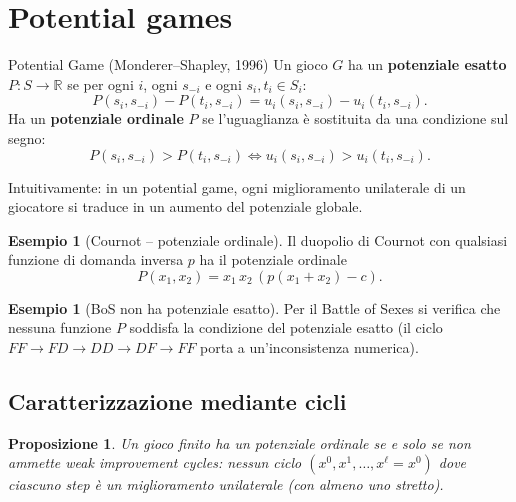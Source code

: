 \documentclass[12pt,a4paper,twoside]{book}
\theoremstyle{plain}
\newtheorem{proposition}[theorem]{Proposizione}
\theoremstyle{definition}
\newtheorem{example}[theorem]{Esempio}
\begin{document}
\section{Potential games}

\begin{defbox}{Potential Game (Monderer--Shapley, 1996)}
Un gioco $G$ ha un \textbf{potenziale esatto} $P:S\to\mathbb{R}$ se per ogni $i$, ogni $s_{-i}$ e ogni $s_i,t_i\in S_i$:
\[
  P(s_i,s_{-i}) - P(t_i,s_{-i}) = u_i(s_i,s_{-i}) - u_i(t_i,s_{-i}).
\]
Ha un \textbf{potenziale ordinale} $P$ se l'uguaglianza è sostituita da una condizione sul segno:
\[
  P(s_i,s_{-i}) > P(t_i,s_{-i}) \iff u_i(s_i,s_{-i}) > u_i(t_i,s_{-i}).
\]
\end{defbox}

Intuitivamente: in un potential game, ogni miglioramento unilaterale di un giocatore si traduce in un aumento del potenziale globale.

\begin{example}[Cournot -- potenziale ordinale]
Il duopolio di Cournot con qualsiasi funzione di domanda inversa $p$ ha il potenziale ordinale
\[
  P(x_1,x_2) = x_1\,x_2\,(p(x_1+x_2)-c).
\]
\end{example}

\begin{example}[BoS non ha potenziale esatto]
Per il Battle of Sexes si verifica che nessuna funzione $P$ soddisfa la condizione del potenziale esatto (il ciclo $FF\to FD\to DD\to DF\to FF$ porta a un'inconsistenza numerica).
\end{example}

\subsection{Caratterizzazione mediante cicli}

\begin{proposition}
Un gioco finito ha un potenziale ordinale se e solo se non ammette \emph{weak improvement cycles}: nessun ciclo $(x^0,x^1,\dots,x^\ell=x^0)$ dove ciascuno step è un miglioramento unilaterale (con almeno uno stretto).
\end{proposition}
\end{document}
